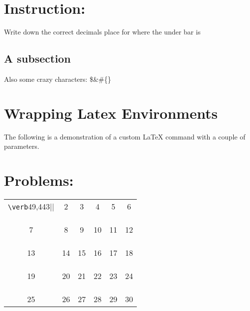 \documentclass{article}%
\begin{document}
%
\normalsize%
\section{Instruction:}%
\label{sec:Instruction}%
Write down the correct decimals place for where the under bar is \newline%
%
\subsection{A subsection}%
\label{subsec:Asubsection}%
Also some crazy characters: \$\&\#\{\}

%
\section{Wrapping Latex Environments}%
\label{sec:WrappingLatexEnvironments}%

        The following is a demonstration of a custom \LaTeX{}
        command with a couple of parameters.
        

%
\section{Problems:}%
\label{sec:Problems}%
\begin{tabular}{cccccc}%
\verb|\verb|49\overline0,443||&2&3&4&5&6\\%
&&&&&\\%
&&&&&\\%
&&&&&\\%
7&8&9&10&11&12\\%
&&&&&\\%
&&&&&\\%
&&&&&\\%
13&14&15&16&17&18\\%
&&&&&\\%
&&&&&\\%
&&&&&\\%
19&20&21&22&23&24\\%
&&&&&\\%
&&&&&\\%
&&&&&\\%
25&26&27&28&29&30\\%
\end{tabular}

%
\end{document}
